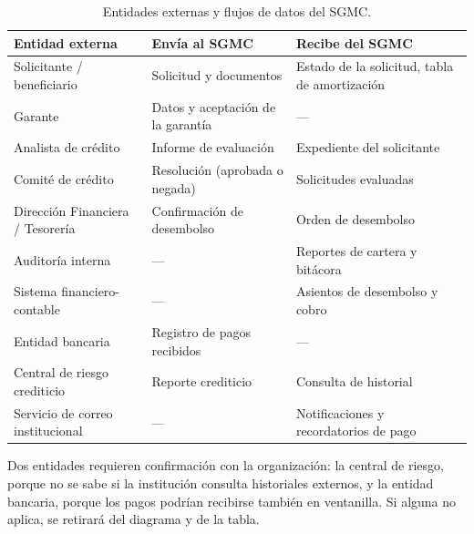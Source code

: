 \begin{table}[htbp]
\centering
\caption{Entidades externas y flujos de datos del SGMC.}
\label{tab:entidades}
\small
\begin{tabularx}{\textwidth}{@{}>{\raggedright\arraybackslash}p{3.4cm}>{\raggedright\arraybackslash}X>{\raggedright\arraybackslash}X@{}}
\toprule
\textbf{Entidad externa} & \textbf{Envía al SGMC} & \textbf{Recibe del SGMC} \\
\midrule
Solicitante / beneficiario & Solicitud y documentos & Estado de la solicitud, tabla de amortización \\
Garante & Datos y aceptación de la garantía & --- \\
Analista de crédito & Informe de evaluación & Expediente del solicitante \\
Comité de crédito & Resolución (aprobada o negada) & Solicitudes evaluadas \\
Dirección Financiera / Tesorería & Confirmación de desembolso & Orden de desembolso \\
Auditoría interna & --- & Reportes de cartera y bitácora \\
Sistema financiero-contable & --- & Asientos de desembolso y cobro \\
Entidad bancaria & Registro de pagos recibidos & --- \\
Central de riesgo crediticio & Reporte crediticio & Consulta de historial \\
Servicio de correo institucional & --- & Notificaciones y recordatorios de pago \\
\bottomrule
\end{tabularx}
\end{table}

Dos entidades requieren confirmación con la organización: la central de riesgo, porque no se sabe si la institución consulta historiales externos, y la entidad bancaria, porque los pagos podrían recibirse también en ventanilla. Si alguna no aplica, se retirará del diagrama y de la tabla.


